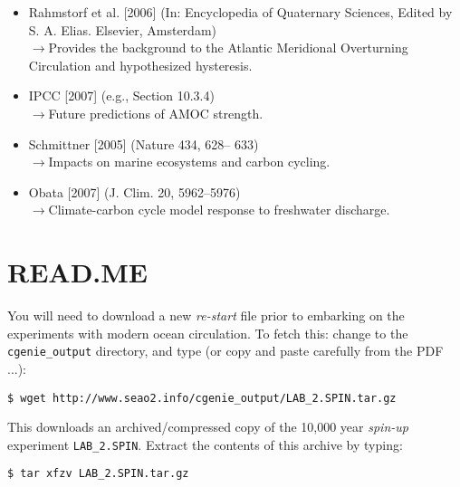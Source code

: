 \documentclass[11pt,fleqn]{book} %
\begin{document}
\vspace{2mm}
\begin{itemize}
\item Rahmstorf et al. [2006] (In: Encyclopedia of Quaternary Sciences, Edited by S. A. Elias. Elsevier, Amsterdam)
\\\(\rightarrow\)Provides the background to the Atlantic Meridional Overturning Circulation and hypothesized hysteresis.
\item IPCC [2007] (e.g., Section 10.3.4)
\\\(\rightarrow\)Future predictions of AMOC strength.
\item Schmittner [2005] (Nature 434, 628– 633)
\\\(\rightarrow\)Impacts on marine ecosystems and carbon cycling.
\item Obata [2007] (J. Clim. 20, 5962–5976)
\\\(\rightarrow\)Climate-carbon cycle model response to freshwater discharge.
\end{itemize}


\newpage


\section*{READ.ME}

You will need to download a new \textit{re-start} file prior to embarking on the experiments with modern ocean circulation.
To fetch this: change to the \texttt{cgenie\_output} directory, and type (or copy and paste carefully from the PDF ...):

\vspace{-2mm}
\begin{verbatim}
$ wget http://www.seao2.info/cgenie_output/LAB_2.SPIN.tar.gz
\end{verbatim}
\vspace{-2mm}

This downloads an archived/compressed copy of the 10,000 year \textit{spin-up} experiment \texttt{LAB\_2.SPIN}. Extract the contents of this archive by typing:

\vspace{-2mm}
\begin{verbatim}
$ tar xfzv LAB_2.SPIN.tar.gz 
\end{verbatim}
\vspace{-2mm}
\end{document}
